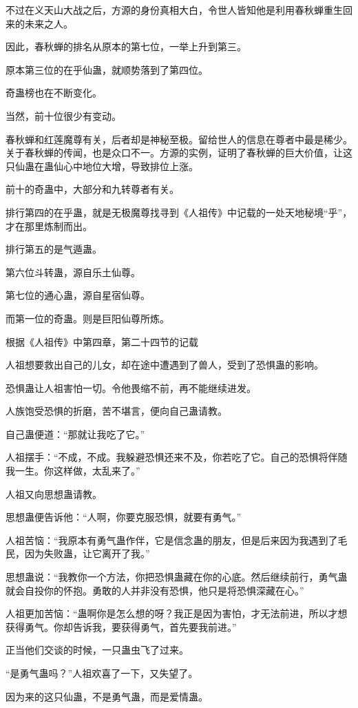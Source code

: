 \begin{this_body}
不过在义天山大战之后，方源的身份真相大白，令世人皆知他是利用春秋蝉重生回来的未来之人。

因此，春秋蝉的排名从原本的第七位，一举上升到第三。

原本第三位的在乎仙蛊，就顺势落到了第四位。

奇蛊榜也在不断变化。

当然，前十位很少有变动。

春秋蝉和红莲魔尊有关，后者却是神秘至极。留给世人的信息在尊者中最是稀少。关于春秋蝉的传闻，也是众口不一。方源的实例，证明了春秋蝉的巨大价值，让这只仙蛊在蛊仙心中地位大增，导致排位上涨。

前十的奇蛊中，大部分和九转尊者有关。

排行第四的在乎蛊，就是无极魔尊找寻到《人祖传》中记载的一处天地秘境“乎”，才在那里炼制而出。

排行第五的是气遁蛊。

第六位斗转蛊，源自乐土仙尊。

第七位的通心蛊，源自星宿仙尊。

而第一位的奇蛊。则是巨阳仙尊所炼。

根据《人祖传》中第四章，第二十四节的记载

人祖想要救出自己的儿女，却在途中遭遇到了兽人，受到了恐惧蛊的影响。

恐惧蛊让人祖害怕一切。令他畏缩不前，再不能继续进发。

人族饱受恐惧的折磨，苦不堪言，便向自己蛊请教。

自己蛊便道：“那就让我吃了它。”

人祖摆手：“不成，不成。我躲避恐惧还来不及，你若吃了它。自己的恐惧将伴随我一生。你这样做，太乱来了。”

人祖又向思想蛊请教。

思想蛊便告诉他：“人啊，你要克服恐惧，就要有勇气。”

人祖苦恼：“我原本有勇气蛊作伴，它是信念蛊的朋友，但是后来因为我遇到了毛民，因为失败蛊，让它离开了我。”

思想蛊说：“我教你一个方法，你把恐惧蛊藏在你的心底。然后继续前行，勇气蛊就会自投你的怀抱。勇敢的人并非没有恐惧，他只是将恐惧深藏在心。”

人祖更加苦恼：“蛊啊你是怎么想的呀？我正是因为害怕，才无法前进，所以才想获得勇气。你却告诉我，要获得勇气，首先要我前进。”

正当他们交谈的时候，一只蛊虫飞了过来。

“是勇气蛊吗？”人祖欢喜了一下，又失望了。

因为来的这只仙蛊，不是勇气蛊，而是爱情蛊。


\end{this_body}
